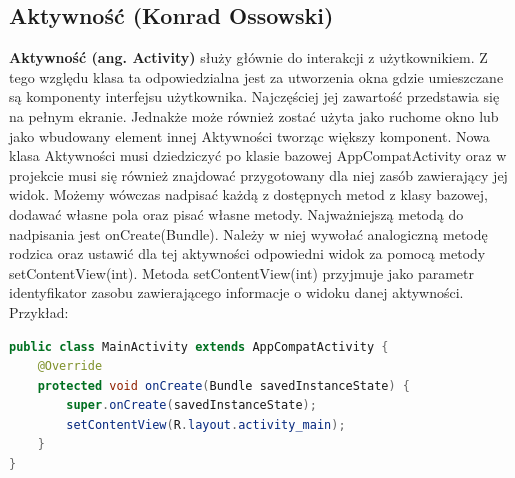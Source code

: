\subsection{Aktywność (Konrad Ossowski)}
\textbf{Aktywność (ang. Activity)} służy głównie do interakcji z użytkownikiem. Z tego względu klasa ta odpowiedzialna jest za utworzenia okna gdzie umieszczane są komponenty interfejsu użytkownika. Najczęściej jej zawartość przedstawia się na pełnym ekranie. Jednakże może również zostać użyta jako ruchome okno lub jako wbudowany element innej Aktywności tworząc większy komponent. Nowa klasa Aktywności musi dziedziczyć po klasie bazowej AppCompatActivity oraz w projekcie musi się również znajdować przygotowany dla niej zasób zawierający jej widok. Możemy wówczas nadpisać każdą z dostępnych metod z klasy bazowej, dodawać własne pola oraz pisać własne metody. Najważniejszą metodą do nadpisania jest onCreate(Bundle). Należy w niej wywołać analogiczną metodę rodzica oraz ustawić dla tej aktywności odpowiedni widok za pomocą metody setContentView(int). Metoda setContentView(int) przyjmuje jako parametr identyfikator zasobu zawierającego informacje o widoku danej aktywności.\cite{activity} Przykład:
\begin{lstlisting}[language=Java]
public class MainActivity extends AppCompatActivity {
    @Override
    protected void onCreate(Bundle savedInstanceState) {
        super.onCreate(savedInstanceState);
        setContentView(R.layout.activity_main);
    }
}
\end{lstlisting}
